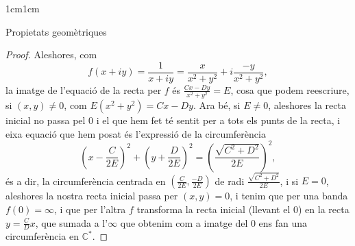 \begin{adjustwidth}{1cm}{1cm}
\begin{subsection}{Propietats geomètriques}
\begin{proof}
        Aleshores, com 
        \[
            f(x+iy)=\frac{1}{x+iy}=\frac{x}{x^2+y^2}+i \frac{-y}{x^2+y^2},
        \]
        la imatge de l'equació de la recta per $f$ és $\frac{Cx-Dy}{x^2+y^2}=E$, cosa que podem reescriure, si $(x,y)\neq 0$, com $E(x^2+y^2)=Cx-Dy$. Ara bé,  si $E\neq 0$, aleshores la recta inicial no passa pel $0$ i el que hem fet té sentit per a tots els punts de la recta, i eixa equació que hem posat és l'expressió de la circumferència 
        \[
            \left(x-\frac{C}{2E}\right)^2+\left(y+\frac{D}{2E}\right)^2=\left(\frac{\sqrt{C^2+D^2}}{2E}\right)^2,
        \]
        és a dir, la circumferència centrada en $\left(\frac{C}{2E},\frac{-D}{2E}\right)$ de radi $\frac{\sqrt{C^2+D^2}}{2E}$, i si $E=0$, aleshores la nostra recta inicial passa per $(x,y)=0$, i tenim que per una banda $f(0)=\infty$, i que per l'altra $f$ transforma la recta inicial (llevant el $0$) en la recta $y=\frac{C}{D}x$, que sumada a l'$\infty$ que obtenim com a imatge del $0$ ens fan una circumferència en $\mathbb{C}^*$.
    \end{proof}

    \end{subsection}

\end{adjustwidth}